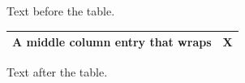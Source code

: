 \documentclass[12pt]{article}
\begin{document}
Text before the table.

\begin{tabular}{|m{3cm}|l|}\hline A middle column entry that wraps & X\\\hline\end{tabular}

Text after the table.
\end{document}
